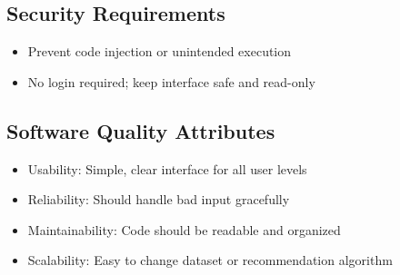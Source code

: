 \documentclass{article}
\begin{document}
\subsection{Security Requirements}
\begin{itemize}
    \item Prevent code injection or unintended execution
    \item No login required; keep interface safe and read-only
\end{itemize}

\subsection{Software Quality Attributes}
\begin{itemize}
    \item Usability: Simple, clear interface for all user levels
    \item Reliability: Should handle bad input gracefully
    \item Maintainability: Code should be readable and organized
    \item Scalability: Easy to change dataset or recommendation algorithm
\end{itemize}
\end{document}
